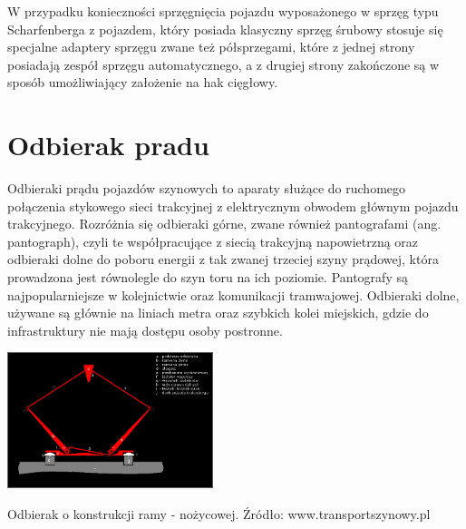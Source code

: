 W przypadku konieczności sprzęgnięcia pojazdu wyposażonego w sprzęg typu Scharfenberga z pojazdem, który posiada klasyczny sprzęg śrubowy stosuje się specjalne adaptery sprzęgu zwane też półsprzegami, które z jednej strony posiadają
zespół sprzęgu automatycznego, a z drugiej strony zakończone są w sposób umożliwiający założenie na hak cięgłowy.

\section{Odbierak pradu}
Odbieraki prądu pojazdów szynowych to aparaty służące do ruchomego połączenia stykowego sieci trakcyjnej z elektrycznym obwodem głównym pojazdu trakcyjnego. Rozróżnia się odbieraki górne, zwane również pantografami (ang. pantograph), czyli te współpracujące z siecią trakcyjną napowietrzną oraz odbieraki dolne do poboru energii z tak zwanej trzeciej szyny prądowej, która prowadzona jest równolegle do szyn toru na ich poziomie. 
Pantografy są najpopularniejsze w kolejnictwie oraz komunikacji tramwajowej. Odbieraki dolne, używane są głównie na liniach metra oraz szybkich kolei miejskich, gdzie do infrastruktury nie mają dostępu osoby postronne. 

\begin{marginfigure}
	\includegraphics[width=6cm]{skryptkierownik-img/kolodbierakschem1.png}
	\caption{Odbierak o konstrukcji ramy - nożycowej. Źródło: www.transportszynowy.pl}
	\label{fig:pantograf1}
\end{marginfigure}

